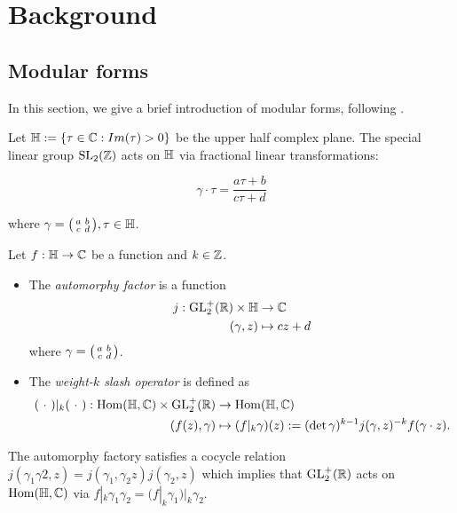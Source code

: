 \section{Background}

\subsection{Modular forms}

In this section, we give a brief introduction of modular forms, following \cite{Shurman}.

Let $\mathbb{H} := \{ \tau \in \mathbb{C}: Im(\tau) > 0 \}$ be the upper half complex plane. The special linear group $\operatorname{SL}_2(\mathbb{Z})$ acts on $\mathbb{H}$ via fractional linear transformations:

\[
\gamma \cdot \tau = \frac{a\tau + b}{c \tau + d}
\] 

where $\gamma = \begin{psmallmatrix} a & b \\ c & d \end{psmallmatrix}, \tau \in \mathbb{H}$. 

\begin{defn}
Let $f: \mathbb{H} \rightarrow \mathbb{C}$ be a function and $k \in \mathbb{Z}$. 

\begin{itemize}
    \item The \textit{automorphy factor} is a function \begin{align*}j: \operatorname{GL}_2^+(\mathbb{R}) \times \mathbb{H} &\rightarrow \mathbb{C} \\ (\gamma,z) &\mapsto cz+d \end{align*}
    where $\gamma = \begin{psmallmatrix} a & b \\ c & d \end{psmallmatrix}$.
    \item The \textit{weight-$k$ slash operator} is defined as 
    \begin{align*}
( \ \cdot \ )|_k (\ \cdot \ ): \operatorname{Hom}(\mathbb{H},\mathbb{C}) \times \operatorname{GL}_2^+(\mathbb{R}) &\rightarrow \operatorname{Hom}(\mathbb{H},\mathbb{C}) \\
(f(z),\gamma) &\mapsto (f|_k \gamma)(z) := (\det \gamma)^{k-1} j(\gamma,z)^{-k} f(\gamma \cdot z).
    \end{align*}
    \end{itemize}
\end{defn}

The automorphy factory satisfies a cocycle relation $j(\gamma_1\gamma2,z) = j(\gamma_1,\gamma_2 z)j(\gamma_2,z)$ which implies that $\operatorname{GL}_2^+(\mathbb{R})$ acts on $\operatorname{Hom}(\mathbb{H},\mathbb{C})$ via $f|_k\gamma_1\gamma_2 = (f|_k\gamma_1)|_k\gamma_2$.

